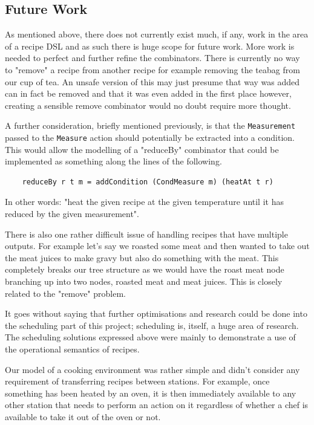 \documentclass[11pt]{article}
\begin{document}
\subsection{Future Work}

As mentioned above, there does not currently exist much, if any, work in the area of
a recipe DSL and as such there is huge scope for future work. More work is needed
to perfect and further refine the combinators. There is currently no way to
"remove" a recipe from another recipe for example removing the teabag from our cup of tea.
An unsafe version of this may just presume that way was added can in fact be removed
and that it was even added in the first place however, creating a sensible remove
combinator would no doubt require more thought.

\medbreak

A further consideration, briefly mentioned previously, is that the \texttt{Measurement}
passed to the \texttt{Measure} action should potentially be extracted into a condition.
This would allow the modelling of a "reduceBy" combinator that could be implemented as
something along the lines of the following.

\begin{lstlisting}
    reduceBy r t m = addCondition (CondMeasure m) (heatAt t r)
\end{lstlisting}

In other words: "heat the given recipe at the given temperature until it has reduced by the given measurement".

\medbreak

There is also one rather difficult issue of handling recipes that have multiple
outputs. For example let's say we roasted some meat and then wanted to take out the
meat juices to make gravy but also do something with the meat. This completely breaks
our tree structure as we would have the roast meat node branching up into two nodes,
roasted meat and meat juices. This is closely related to the "remove" problem.

\medbreak

It goes without saying that further optimisations and research could be done into the
scheduling part of this project; scheduling is, itself, a huge area of research.
The scheduling solutions expressed above were mainly to demonstrate a use of
the operational semantics of recipes.

\medbreak

Our model of a cooking environment was rather simple and didn't consider any requirement
of transferring recipes between stations. For example, once something has been heated
by an oven, it is then immediately available to any other station that needs to perform
an action on it regardless of whether a chef is available to take it out of the oven or not.
\end{document}
